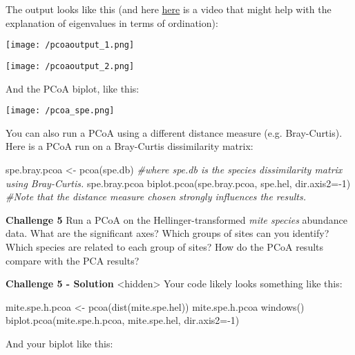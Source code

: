 \documentclass[
]{book}
\newenvironment{Shaded}{\begin{snugshade}}{\end{snugshade}}
\newcommand{\AttributeTok}[1]{\textcolor[rgb]{0.77,0.63,0.00}{#1}}
\newcommand{\CommentTok}[1]{\textcolor[rgb]{0.56,0.35,0.01}{\textit{#1}}}
\newcommand{\DecValTok}[1]{\textcolor[rgb]{0.00,0.00,0.81}{#1}}
\newcommand{\FunctionTok}[1]{\textcolor[rgb]{0.00,0.00,0.00}{#1}}
\newcommand{\NormalTok}[1]{#1}
\newcommand{\OtherTok}[1]{\textcolor[rgb]{0.56,0.35,0.01}{#1}}
\newcommand{\SpecialCharTok}[1]{\textcolor[rgb]{0.00,0.00,0.00}{#1}}
\begin{document}
The output looks like this (and here
\href{https://www.youtube.com/watch?v=lRdX1qhI7Dw}{here} is a video that
might help with the explanation of eigenvalues in terms of ordination):

\texttt{[image: /pcoaoutput\_1.png]}

\texttt{[image: /pcoaoutput\_2.png]}

And the PCoA biplot, like this:

\texttt{[image: /pcoa\_spe.png]}

You can also run a PCoA using a different distance measure (e.g.
Bray-Curtis). Here is a PCoA run on a Bray-Curtis dissimilarity matrix:

\begin{Shaded}
\begin{Highlighting}[]
\NormalTok{spe.bray.pcoa }\OtherTok{\textless{}{-}} \FunctionTok{pcoa}\NormalTok{(spe.db) }\CommentTok{\#where spe.db is the species dissimilarity matrix using Bray{-}Curtis. }
\NormalTok{spe.bray.pcoa}
\FunctionTok{biplot.pcoa}\NormalTok{(spe.bray.pcoa, spe.hel, }\AttributeTok{dir.axis2=}\SpecialCharTok{{-}}\DecValTok{1}\NormalTok{)}
\CommentTok{\#Note that the distance measure chosen strongly influences the results. }
\end{Highlighting}
\end{Shaded}

\textbf{Challenge 5} Run a PCoA on the Hellinger-transformed \emph{mite species}
abundance data. What are the significant axes? Which groups of sites can
you identify? Which species are related to each group of sites? How do
the PCoA results compare with the PCA results?

\textbf{Challenge 5 - Solution} \textless hidden\textgreater{} Your code likely looks something
like this:

\begin{Shaded}
\begin{Highlighting}[]
\NormalTok{mite.spe.h.pcoa }\OtherTok{\textless{}{-}} \FunctionTok{pcoa}\NormalTok{(}\FunctionTok{dist}\NormalTok{(mite.spe.hel))}
\NormalTok{mite.spe.h.pcoa}
\FunctionTok{windows}\NormalTok{()}
\FunctionTok{biplot.pcoa}\NormalTok{(mite.spe.h.pcoa, mite.spe.hel, }\AttributeTok{dir.axis2=}\SpecialCharTok{{-}}\DecValTok{1}\NormalTok{)}
\end{Highlighting}
\end{Shaded}

And your biplot like this:
\end{document}
